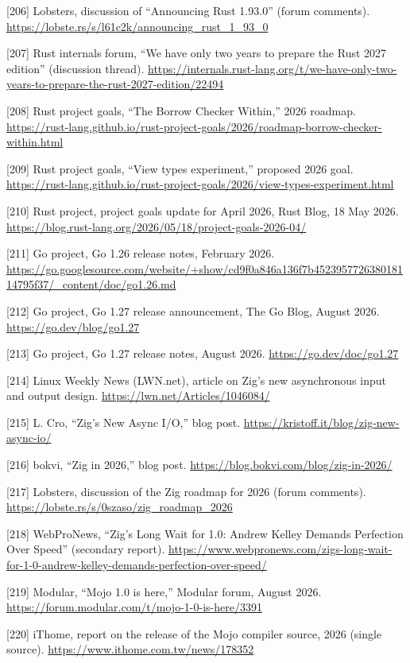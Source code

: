 \documentclass[10pt,letterpaper]{article}
\begin{document}
{[}206{]} Lobsters, discussion of ``Announcing Rust 1.93.0'' (forum
comments). \url{https://lobste.rs/s/l61c2k/announcing_rust_1_93_0}

{[}207{]} Rust internals forum, ``We have only two years to prepare the
Rust 2027 edition'' (discussion thread).
\url{https://internals.rust-lang.org/t/we-have-only-two-years-to-prepare-the-rust-2027-edition/22494}

{[}208{]} Rust project goals, ``The Borrow Checker Within,'' 2026
roadmap.
\url{https://rust-lang.github.io/rust-project-goals/2026/roadmap-borrow-checker-within.html}

{[}209{]} Rust project goals, ``View types experiment,'' proposed 2026
goal.
\url{https://rust-lang.github.io/rust-project-goals/2026/view-types-experiment.html}

{[}210{]} Rust project, project goals update for April 2026, Rust Blog,
18 May 2026.
\url{https://blog.rust-lang.org/2026/05/18/project-goals-2026-04/}

{[}211{]} Go project, Go 1.26 release notes, February 2026.
\url{https://go.googlesource.com/website/+show/cd9f0a846a136f7b452395772638018114795f37/_content/doc/go1.26.md}

{[}212{]} Go project, Go 1.27 release announcement, The Go Blog, August
2026. \url{https://go.dev/blog/go1.27}

{[}213{]} Go project, Go 1.27 release notes, August 2026.
\url{https://go.dev/doc/go1.27}

{[}214{]} Linux Weekly News (LWN.net), article on Zig's new asynchronous
input and output design. \url{https://lwn.net/Articles/1046084/}

{[}215{]} L. Cro, ``Zig's New Async I/O,'' blog post.
\url{https://kristoff.it/blog/zig-new-async-io/}

{[}216{]} bokvi, ``Zig in 2026,'' blog post.
\url{https://blog.bokvi.com/blog/zig-in-2026/}

{[}217{]} Lobsters, discussion of the Zig roadmap for 2026 (forum
comments). \url{https://lobste.rs/s/0szaso/zig_roadmap_2026}

{[}218{]} WebProNews, ``Zig's Long Wait for 1.0: Andrew Kelley Demands
Perfection Over Speed'' (secondary report).
\url{https://www.webpronews.com/zigs-long-wait-for-1-0-andrew-kelley-demands-perfection-over-speed/}

{[}219{]} Modular, ``Mojo 1.0 is here,'' Modular forum, August 2026.
\url{https://forum.modular.com/t/mojo-1-0-is-here/3391}

{[}220{]} iThome, report on the release of the Mojo compiler source,
2026 (single source). \url{https://www.ithome.com.tw/news/178352}
\end{document}
